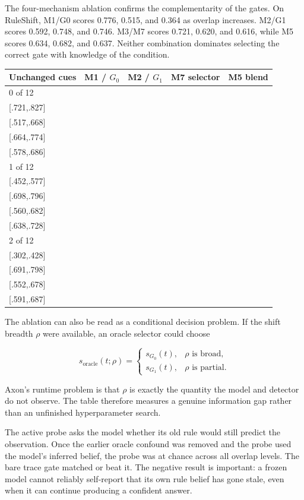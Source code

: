 \documentclass[pdflatex,sn-basic]{sn-jnl}
\makeatletter
\theoremstyle{definition}
\newcommand{\aucci}[3]{\shortstack{#1\\[-1pt]\scriptsize[#2,#3]}}
\newenvironment{eqbox}%
{\par\vspace{9pt}\noindent\begin{lrbox}{\eqsavebox}\begin{minipage}{\dimexpr\linewidth-18pt}\boldmath}%
{\end{minipage}\end{lrbox}\setlength{\fboxsep}{8pt}\noindent\colorbox{eqgrey}{\usebox{\eqsavebox}}\par\vspace{7pt}}
\def\tablebodyfont{\reset@font\fontsize{10.5bp}{12.5bp}\selectfont}
\renewenvironment{table}[1][]%
{\begin{tableorg}[#1]%
  \begin{center}%
  \begin{threeparttable}%
  \tablebodyfont%
  \setlength{\parskip}{0pt}%
  \renewcommand{\arraystretch}{1.20}%
  \renewcommand\footnotetext[2][]{{\removelastskip\vskip3pt%
    \let\tablebodyfont\tablefootnotefont%
    \hskip0pt\if!##1!\else{\smash{$^{##1}$}}\fi##2\par}}%
}{\end{threeparttable}\end{center}\end{tableorg}}
\makeatother
\begin{document}
The four-mechanism ablation confirms the complementarity of the gates. On RuleShift, M1/G0
scores 0.776, 0.515, and 0.364 as overlap increases. M2/G1 scores 0.592, 0.748, and
0.746. M3/M7 scores 0.721, 0.620, and 0.616, while M5 scores 0.634, 0.682, and 0.637.
Neither combination dominates selecting the correct gate with knowledge of the condition.

\begin{table}[!ht]
\centering\footnotesize
\setlength{\tabcolsep}{4pt}
\begin{tabular}{lrrrr}
\toprule
Unchanged cues & M1 / $G_0$ & M2 / $G_1$ & M7 selector & M5 blend\\
\midrule
0 of 12 & \aucci{.776}{.721}{.827} & \aucci{.592}{.517}{.668} & \aucci{.721}{.664}{.774} & \aucci{.634}{.578}{.686}\\
1 of 12 & \aucci{.515}{.452}{.577} & \aucci{.748}{.698}{.796} & \aucci{.620}{.560}{.682} & \aucci{.682}{.638}{.728}\\
2 of 12 & \aucci{.364}{.302}{.428} & \aucci{.746}{.691}{.798} & \aucci{.616}{.552}{.678} & \aucci{.637}{.591}{.687}\\
\bottomrule
\end{tabular}
\caption{Registered RuleShift ablation, AUROC [95\% bootstrap CI], $n=240$ per overlap row.
Broad shifts favor cling; partial shifts favor contradiction. The selector does not identify
this condition robustly from the trace alone.}
\label{tab:ablation}
\end{table}

The ablation can also be read as a conditional decision problem. If the shift breadth $\rho$
were available, an oracle selector could choose

\begin{eqbox}
\[
s_{\mathrm{oracle}}(t;\rho)=
\begin{cases}
s_{G_0}(t),&\rho\text{ is broad},\\
s_{G_1}(t),&\rho\text{ is partial}.
\end{cases}
\]
\end{eqbox}

Axon's runtime problem is that $\rho$ is exactly the quantity the model and detector do not
observe. The table therefore measures a genuine information gap rather than an unfinished
hyperparameter search.

The active probe asks the model whether its old rule would still predict the observation. Once
the earlier oracle confound was removed and the probe used the model's inferred belief, the
probe was at chance across all overlap levels. The bare trace gate matched or beat it. The
negative result is important: a frozen model cannot reliably self-report that its own rule
belief has gone stale, even when it can continue producing a confident answer.
\end{document}
